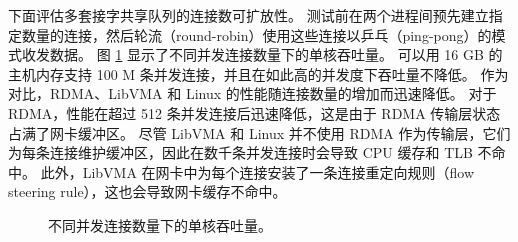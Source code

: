 %


下面评估多套接字共享队列的连接数可扩放性。
测试前在两个进程间预先建立指定数量的连接，然后轮流（round-robin）使用这些连接以乒乓（ping-pong）的模式收发数据。
图 \ref{socksdirect:fig:eval-connnum-tput} 显示了不同并发连接数量下的单核吞吐量。
\sys{} 可以用 16 GB 的主机内存支持 100 M 条并发连接，并且在如此高的并发度下吞吐量不降低。
作为对比，RDMA、LibVMA 和 Linux 的性能随连接数量的增加而迅速降低。
对于 RDMA，性能在超过 512 条并发连接后迅速降低，这是由于 RDMA 传输层状态占满了网卡缓冲区。
尽管 LibVMA 和 Linux 并不使用 RDMA 作为传输层，它们为每条连接维护缓冲区，因此在数千条并发连接时会导致 CPU 缓存和 TLB 不命中。
此外，LibVMA 在网卡中为每个连接安装了一条连接重定向规则（flow steering rule），这也会导致网卡缓存不命中。

\begin{figure}[htbp]
	\centering
	
	\caption{不同并发连接数量下的单核吞吐量。}
	\label{socksdirect:fig:eval-connnum-tput}
\end{figure}





